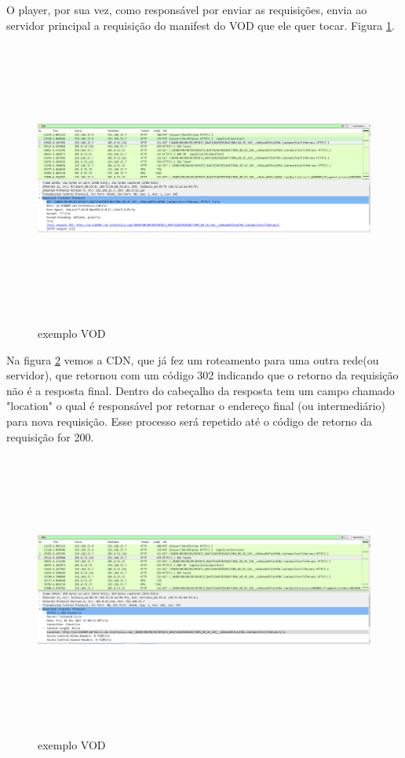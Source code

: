O player, por sua vez, como respons\'avel por enviar as requisi\c{c}\~oes, envia ao servidor principal a requisi\c{c}\~ao do manifest do VOD que ele quer tocar. Figura \ref{figura:exemplo_vod_2}.
\begin{figure}[H]
\caption{exemplo VOD}
\includegraphics[height=9cm]{Figuras/exemplo_vod_2.png} 
\label{figura:exemplo_vod_2}
\end{figure}

Na figura \ref{figura:exemplo_vod_3} vemos a CDN, que j\'a fez um roteamento para uma outra rede(ou servidor), que retornou com um c\'odigo 302 indicando que o retorno da requisi\c{c}\~ao n\~ao \'e a resposta final. Dentro do cabe\c{c}alho da resposta tem um campo chamado "location" o qual \'e respons\'avel por retornar o endere\c{c}o final (ou intermedi\'ario) para nova requisi\c{c}\~ao. Esse processo ser\'a repetido at\'e o c\'odigo de retorno da requisi\c{c}\~ao for 200.
\begin{figure}[H]
\caption{exemplo VOD}
\includegraphics[height=9cm]{Figuras/exemplo_vod_3.png} 
\label{figura:exemplo_vod_3}
\end{figure}


